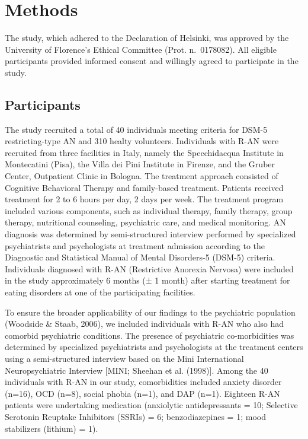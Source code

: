 \documentclass[
  man,floatsintext]{apa6}
\begin{document}
\hypertarget{methods}{%
\section{Methods}\label{methods}}

The study, which adhered to the Declaration of Helsinki, was approved by the University of Florence's Ethical Committee (Prot. n.~0178082). All eligible participants provided informed consent and willingly agreed to participate in the study.

\hypertarget{participants}{%
\subsection{Participants}\label{participants}}

The study recruited a total of 40 individuals meeting criteria for DSM-5 restricting-type AN and 310 healty volunteers. Individuals with R-AN were recruited from three facilities in Italy, namely the Specchidacqua Institute in Montecatini (Pisa), the Villa dei Pini Institute in Firenze, and the Gruber Center, Outpatient Clinic in Bologna. The treatment approach consisted of Cognitive Behavioral Therapy and family-based treatment. Patients received treatment for 2 to 6 hours per day, 2 days per week. The treatment program included various components, such as individual therapy, family therapy, group therapy, nutritional counseling, psychiatric care, and medical monitoring. AN diagnosis was determined by semi-structured interview performed by specialized psychiatrists and psychologists at treatment admission according to the Diagnostic and Statistical Manual of Mental Disorders-5 (DSM-5) criteria. Individuals diagnosed with R-AN (Restrictive Anorexia Nervosa) were included in the study approximately 6 months (± 1 month) after starting treatment for eating disorders at one of the participating facilities.

To ensure the broader applicability of our findings to the psychiatric population (Woodside \& Staab, 2006), we included individuals with R-AN who also had comorbid psychiatric conditions. The presence of psychiatric co-morbidities was determined by specialized psychiatrists and psychologists at the treatment centers using a semi-structured interview based on the Mini International Neuropsychiatric Interview {[}MINI; Sheehan et al. (1998){]}. Among the 40 individuals with R-AN in our study, comorbidities included anxiety disorder (n=16), OCD (n=8), social phobia (n=1), and DAP (n=1). Eighteen R-AN patients were undertaking medication (anxiolytic antidepressants = 10; Selective Serotonin Reuptake Inhibitors (SSRIs) = 6; benzodiazepines = 1; mood stabilizers (lithium) = 1).
\end{document}
